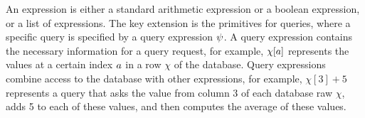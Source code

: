 An expression is
either a standard arithmetic expression or a boolean expression, or a list of expressions.
The key extension is
the primitives for queries, where a specific query is specified by a query expression $\psi$. 
A query expression contains the necessary information for a query request, 
for example, $\chi[a]$ represents the values at a certain index $a$ in a row $\chi$ of the database. 
Query expressions combine access to the database with other expressions, 
for example, $\chi[3] + 5$ represents a query that asks the value from column 3 of each database raw $\chi$, 
adds 5 to each of these values, and then computes the average of these values.

